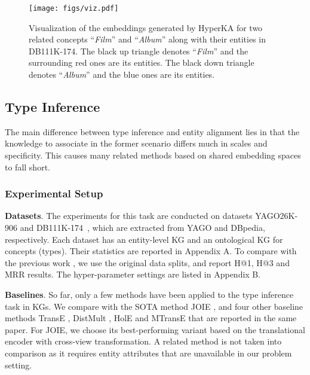\documentclass[11pt,a4paper]{article}
\newcommand{\modelname}{HyperKA\xspace}
\begin{document}
\begin{figure}[!t]
	\centering
	\texttt{[image: figs/viz.pdf]}
	\caption{Visualization of the embeddings generated by \modelname for two related concepts ``\textit{Film}'' and ``\textit{Album}'' along with their entities in DB111K-174. The black up triangle denotes ``\textit{Film}'' and the surrounding red ones are its entities. The black down triangle denotes ``\textit{Album}'' and the blue ones are its entities.}\label{fig:viz}
\end{figure}

\subsection{Type Inference}
\label{subsect:ti}
The main difference between type inference and entity alignment lies in that the knowledge to associate in the former scenario differs much in scales and specificity. This causes many related methods based on shared embedding spaces to fall short. 

\subsubsection{Experimental Setup}
\noindent \textbf{Datasets}.
The experiments for this task are conducted on datasets YAGO26K-906 and DB111K-174~\cite{JOIE}, which are extracted from YAGO and DBpedia, respectively. Each dataset has an entity-level KG and an ontological KG for concepts (types). Their statistics are reported in Appendix A. To compare with the previous work \cite{JOIE}, we use the original data splits, and report H@1, H@3 and MRR results. The hyper-parameter settings are listed in Appendix B.



\noindent \textbf{Baselines}.
So far, only a few methods have been applied to the type inference task in KGs. We compare with the SOTA method JOIE \cite{JOIE}, and four other baseline methods TransE \cite{TransE}, DistMult \cite{DistMult}, HolE \cite{HolE} and MTransE \cite{MTransE} that are reported in the same paper. For JOIE, we choose its best-performing variant based on the translational encoder with cross-view transformation. A related method \cite{Entity_Typing} is not taken into comparison as it requires entity attributes that are unavailable in our problem setting.
\end{document}
